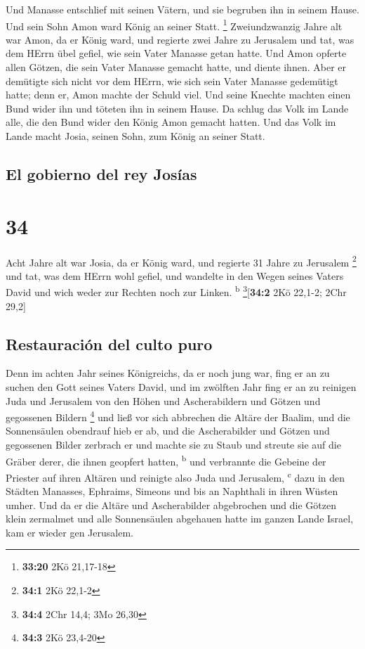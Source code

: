  Und Manasse entschlief mit seinen Vätern, und sie
begruben ihn in seinem Hause. Und sein Sohn Amon ward König an seiner
Statt. \footnote{\textbf{33:20} 2Kö 21,17-18} 
Zweiundzwanzig Jahre alt war Amon, da er König ward, und regierte zwei
Jahre zu Jerusalem  und tat, was dem HErrn übel gefiel,
wie sein Vater Manasse getan hatte. Und Amon opferte allen Götzen, die
sein Vater Manasse gemacht hatte, und diente ihnen.  Aber
er demütigte sich nicht vor dem HErrn, wie sich sein Vater Manasse
gedemütigt hatte; denn er, Amon machte der Schuld viel. 
Und seine Knechte machten einen Bund wider ihn und töteten ihn in seinem
Hause.  Da schlug das Volk im Lande alle, die den Bund
wider den König Amon gemacht hatten. Und das Volk im Lande macht Josia,
seinen Sohn, zum König an seiner Statt.

\hypertarget{el-gobierno-del-rey-josuxedas}{%
\subsection{El gobierno del rey
Josías}\label{el-gobierno-del-rey-josuxedas}}

\hypertarget{section-33}{%
\section{34}\label{section-33}}

 Acht Jahre alt war Josia, da er König ward, und regierte
31 Jahre zu Jerusalem \footnote{\textbf{34:1} 2Kö 22,1-2} 
und tat, was dem HErrn wohl gefiel, und wandelte in den Wegen seines
Vaters David und wich weder zur Rechten noch zur Linken.
\textsuperscript{b} \footnote{\textbf{34:4} 2Chr 14,4; 3Mo 26,30}{[}\textbf{34:2}
2Kö 22,1-2; 2Chr 29,2{]}

\hypertarget{restauraciuxf3n-del-culto-puro}{%
\subsection{Restauración del culto
puro}\label{restauraciuxf3n-del-culto-puro}}

 Denn im achten Jahr seines Königreichs, da er noch jung
war, fing er an zu suchen den Gott seines Vaters David, und im zwölften
Jahr fing er an zu reinigen Juda und Jerusalem von den Höhen und
Ascherabildern und Götzen und gegossenen Bildern \footnote{\textbf{34:3}
  2Kö 23,4-20}  und ließ vor sich abbrechen die Altäre der
Baalim, und die Sonnensäulen obendrauf hieb er ab, und die Ascherabilder
und Götzen und gegossenen Bilder zerbrach er und machte sie zu Staub und
streute sie auf die Gräber derer, die ihnen geopfert hatten,
\textsuperscript{b}  und verbrannte die Gebeine der
Priester auf ihren Altären und reinigte also Juda und Jerusalem,
\textsuperscript{c}  dazu in den Städten Manasses,
Ephraims, Simeons und bis an Naphthali in ihren Wüsten umher.
 Und da er die Altäre und Ascherabilder abgebrochen und
die Götzen klein zermalmet und alle Sonnensäulen abgehauen hatte im
ganzen Lande Israel, kam er wieder gen Jerusalem.

